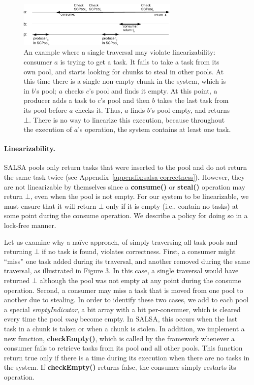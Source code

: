 \begin{figure}[htb]
	\centering
	\includegraphics[width=0.7\textwidth]{figures/linearizability-example}
	\caption{\footnotesize{An example where a single traversal may violate linearizability: consumer $a$ is trying to get a task. It fails to take a task from its own pool, and starts looking for chunks to steal in other pools. At this time there is a single non-empty chunk in the system, which is in $b$'s pool; $a$ checks $c$'s pool and finds it empty. At this point, a producer adds a task to $c$'s pool and then $b$ takes the last task from its pool before $a$ checks it. Thus, $a$ finds $b$'s pool empty, and returns $\bot$. There is no way to linearize this execution, because throughout the execution of $a$'s operation, the system contains at least one task.}}
	\label{fig:linearizability-example}
\end{figure}

\paragraph{Linearizability.}
SALSA pools only return tasks that were inserted to the pool and do not return the same task twice (see Appendix~\ref{appendix:salsa-correctness}). However, they are not linearizable by themselves since a {\bf consume()} or {\bf steal()} operation may return $\bot$, even when the pool is not empty. For our system to be linearizable, we must ensure that it will return $\bot$ only if it is empty (i.e., contain no tasks) at some point during the consume operation. We describe a policy for doing so in a lock-free manner. 

Let us examine why a na\"ive approach, of simply traversing all task pools and returning $\bot$ if no task is found, violates correctness. First, a consumer might ``miss'' one task added during its traversal, and another removed during the same traversal, as illustrated in Figure 3. In this case, a single traversal would have returned $\bot$ although the pool was not empty at any point during the consume operation. Second, a consumer may miss a task that is moved from one pool to another due to stealing. In order to identify these two cases, we add to each pool a special \emph{emptyIndicator}, a bit array with a bit per-consumer, which is cleared every time the pool \emph{may} become empty. In SALSA, this occurs when the last task in a chunk is taken or when a chunk is stolen. 
In addition, we implement a new function, {\bf checkEmpty()}, which is called by the framework whenever a consumer fails to retrieve tasks from its pool and all other pools. This function return true only if there is a time during its execution when there are no tasks in the system. If {\bf checkEmpty()} returns false, the consumer simply restarts its operation. 


